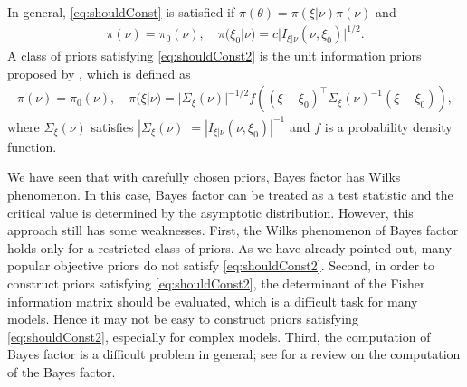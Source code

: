 \documentclass[11pt]{article}
\newcommand{\myT}{\intercal}
\theoremstyle{plain}
\theoremstyle{definition}
\theoremstyle{remark}
\begin{document}
In general, \eqref{eq:shouldConst} is satisfied if $\pi(\theta) = \pi (\xi |\nu) \pi(\nu)$ and
\begin{align}\label{eq:shouldConst2}
    \pi(\nu) = \pi_0 (\nu), \quad \pi(\xi_0 | \nu) = c |I_{\xi | \nu} (\nu,\xi_0)|^{1/2}.
\end{align}
A class of priors satisfying \eqref{eq:shouldConst2} is the unit information priors proposed by \cite{Kass1995}, which is defined as
\begin{align*}
    \pi(\nu) = \pi_0 (\nu), \quad \pi(\xi | \nu) = |\Sigma_\xi(\nu)|^{-1/2} f
    \left((\xi - \xi_0)^\myT \Sigma_\xi(\nu)^{-1} ( \xi - \xi_0)\right),
\end{align*}
where $\Sigma_{\xi}(\nu)$ satisfies
$
|\Sigma_{\xi}(\nu)|= |I_{\xi | \nu} (\nu,\xi_0)|^{-1}
$ 
and $f$ is a probability density function.

We have seen that with carefully chosen priors, Bayes factor has Wilks phenomenon.
In this case, Bayes factor can be treated as a test statistic and the critical value is determined by the asymptotic distribution.
However, this approach still has some weaknesses.
First, the Wilks phenomenon of Bayes factor holds only for a restricted class of priors. %
As we have already pointed out, many popular objective priors do not satisfy \eqref{eq:shouldConst2}.
Second,
in order to construct priors satisfying \eqref{eq:shouldConst2}, the determinant of the Fisher information matrix should be evaluated, which is a difficult task for many models.
Hence it may not be easy to construct priors satisfying \eqref{eq:shouldConst2}, especially for complex models.
Third, the computation of Bayes factor is a difficult problem in general; see \cite{Friel2012} for a review on the computation of the Bayes factor.
\end{document}
